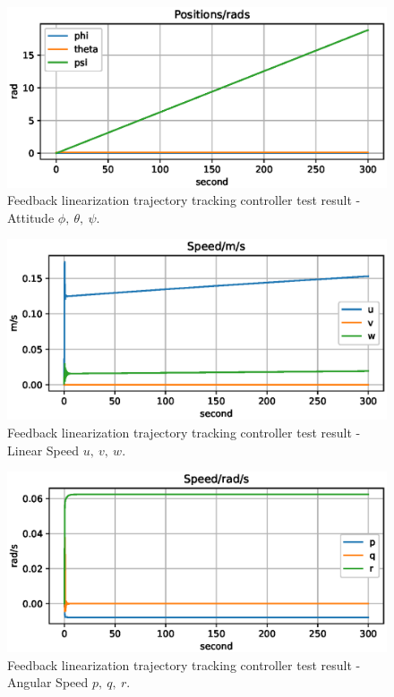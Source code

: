 \begin{figure}[H]
    \centering
    \includegraphics[width=.8\textwidth]{images/05fl-result-circle-ptp.eps}
    \caption{Feedback linearization trajectory tracking controller test result - Attitude $\phi,\ \theta,\ \psi$.}
    \label{fig:05fl-result-circle-ptp}
\end{figure}

\begin{figure}[H]
    \centering
    \includegraphics[width=.8\textwidth]{images/05fl-result-circle-uvw.eps}
    \caption{Feedback linearization trajectory tracking controller test result - Linear Speed $u,\ v,\ w$.}
    \label{fig:05fl-result-circle-uvw}
\end{figure}

\begin{figure}[H]
    \centering
    \includegraphics[width=.8\textwidth]{images/05fl-result-circle-pqr.eps}
    \caption{Feedback linearization trajectory tracking controller test result - Angular Speed $p,\ q,\ r$.}
    \label{fig:05fl-result-circle-pqr}
\end{figure}

